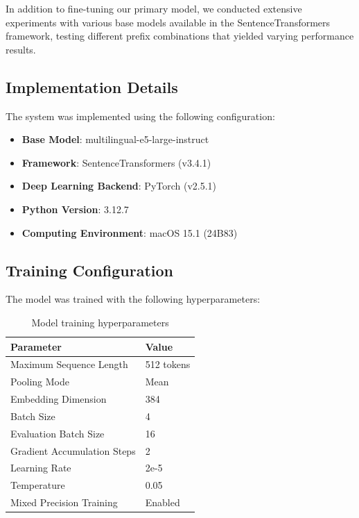 \documentclass[11pt]{article}
\begin{document}
In addition to fine-tuning our primary model, we conducted extensive experiments with various base models available in the SentenceTransformers framework, testing different prefix combinations that yielded varying performance results.

\subsection{Implementation Details}

The system was implemented using the following configuration:

\begin{itemize}
    \item \textbf{Base Model}: multilingual-e5-large-instruct
    \item \textbf{Framework}: SentenceTransformers (v3.4.1)
    \item \textbf{Deep Learning Backend}: PyTorch (v2.5.1)
    \item \textbf{Python Version}: 3.12.7
    \item \textbf{Computing Environment}: macOS 15.1 (24B83)
\end{itemize}

\subsection{Training Configuration}

The model was trained with the following hyperparameters:

\begin{table}[h]
\centering
\small
\begin{tabular}{ll}
\hline
\textbf{Parameter} & \textbf{Value} \\
\hline
Maximum Sequence Length & 512 tokens \\
Pooling Mode & Mean \\
Embedding Dimension & 384 \\
Batch Size & 4 \\
Evaluation Batch Size & 16 \\
Gradient Accumulation Steps & 2 \\
Learning Rate & 2e-5 \\
Temperature & 0.05 \\
Mixed Precision Training & Enabled \\
\hline
\end{tabular}
\caption{Model training hyperparameters}
\label{tab:hyperparams}
\end{table}
\end{document}
